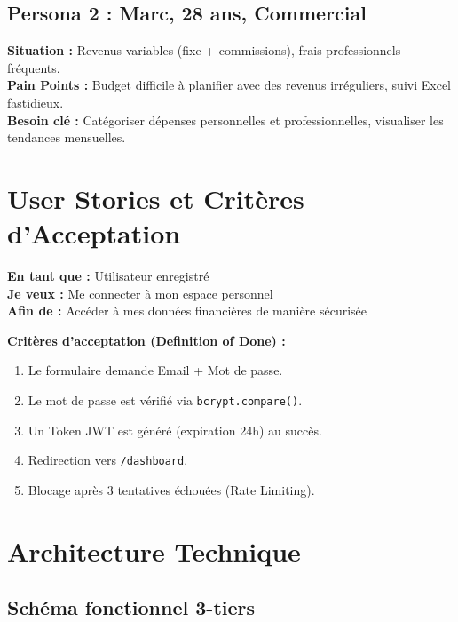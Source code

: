 \subsection{Persona 2 : Marc, 28 ans, Commercial}
\textbf{Situation :} Revenus variables (fixe + commissions), frais professionnels fréquents. \\
\textbf{Pain Points :} Budget difficile à planifier avec des revenus irréguliers, suivi Excel fastidieux. \\
\textbf{Besoin clé :} Catégoriser dépenses personnelles et professionnelles, visualiser les tendances mensuelles.

\section{User Stories et Critères d'Acceptation}

\begin{tcolorbox}[colback=blue!5!white,colframe=blue!60!black,title=\textbf{Exemple de User Story critique : US-01 (Connexion)}]
\textbf{En tant que :} Utilisateur enregistré \\
\textbf{Je veux :} Me connecter à mon espace personnel \\
\textbf{Afin de :} Accéder à mes données financières de manière sécurisée

\textbf{Critères d'acceptation (Definition of Done) :}
\begin{enumerate}
    \item [$\boxtimes$] Le formulaire demande Email + Mot de passe.
    \item [$\boxtimes$] Le mot de passe est vérifié via \texttt{bcrypt.compare()}.
    \item [$\boxtimes$] Un Token JWT est généré (expiration 24h) au succès.
    \item [$\boxtimes$] Redirection vers \texttt{/dashboard}.
    \item [$\boxtimes$] Blocage après 3 tentatives échouées (Rate Limiting).
\end{enumerate}
\end{tcolorbox}

\section{Architecture Technique}

\subsection{Schéma fonctionnel 3-tiers}

